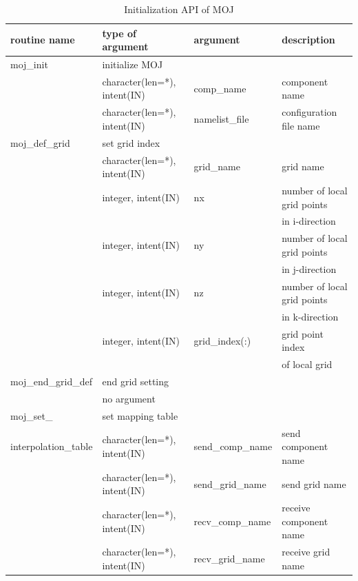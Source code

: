 \documentclass[11pt,a4paper]{report}
\begin{document}
\begin{table}[H]
\begin{center}
\caption{Initialization API of MOJ}
{\small
\label{table:moj_api_initialize}
\begin{tabular}{llll}
\hline\hline
routine name & type of argument & argument　& description \\
\hline
 moj\_init &  \multicolumn{3}{l}{initialize MOJ}\\
           &  character(len=*), intent(IN) &  comp\_name & component name\\
           &  character(len=*), intent(IN) &  namelist\_file & configuration file name\\
\hline
 moj\_def\_grid & \multicolumn{3}{l}{set grid index} \\ 
                & character(len=*), intent(IN) & grid\_name & grid name\\
                & integer, intent(IN) & nx & number of local grid points\\ 
                &                     &    & in i-direction\\
                & integer, intent(IN) & ny & number of local grid points\\
                &                     &    & in j-direction\\
                & integer, intent(IN) & nz & number of local grid points\\
                &                     &    & in k-direction\\
                & integer, intent(IN) & grid\_index(:) & grid point index \\
                &                     &    & of local grid\\
\hline
 moj\_end\_grid\_def &  \multicolumn{3}{l}{end grid setting}\\
                & no argument & & \\
\hline
 moj\_set\_ & \multicolumn{3}{l}{set mapping table} \\ 
 interpolation\_table & character(len=*), intent(IN) & send\_comp\_name & send component name\\
                & character(len=*), intent(IN) & send\_grid\_name & send grid name\\
                & character(len=*), intent(IN) & recv\_comp\_name & receive component name\\
                & character(len=*), intent(IN) & recv\_grid\_name & receive grid name\\

\end{tabular}}
\end{center}
\end{table}
\end{document}
